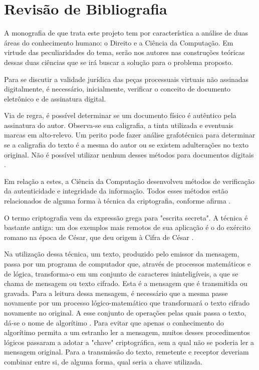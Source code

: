 \chapter{Revisão de Bibliografia}

  A monografia de que trata este projeto tem por característica a
  análise de duas áreas do conhecimento humano: o Direito e a
  Ciência da Computação. Em virtude das peculiaridades do tema,
  serão nos autores nas construções teóricas dessas duas ciências
  que se irá buscar a solução para o problema proposto.\par

  Para se discutir a validade jurídica das peças processuais
  virtuais não assinadas digitalmente, é necessário,
  inicialmente, verificar o conceito de documento eletrônico e de
  assinatura digital.\par

  Via de regra, é possível determinar se um documento físico é
  autêntico pela assinatura do autor. Observa-se sua caligrafia,
  a tinta utilizada e eventuais marcas em alto-relevo. Um perito
  pode fazer análise grafotécnica para determinar se a caligrafia
  do texto é a mesma do autor ou se existem adulterações no texto
  original. Não é possível utilizar nenhum desses métodos para
  documentos digitais \cite{ComputerNetworks, CertificadoDigital}.\par

  Em relação a estes, a Ciência da Computação desenvolveu métodos
  de verificação da autenticidade e integridade da informação.
  Todos esses métodos estão relacionados de alguma forma à
  técnica da criptografia, conforme afirma
  .\par

  O termo criptografia vem da expressão grega para "escrita
  secreta". A técnica é bastante antiga: um dos exemplos mais
  remotos de sua aplicação é o do exército romano na época de
  César, que deu origem à Cifra de César \cite[p.
  555]{ComputerNetworks}.\par

  Na utilização dessa técnica, um texto, produzido pelo emissor da
  mensagem, passa por um programa de computador que, através de
  processos matemáticos e de lógica, transforma-o em um conjunto de
  caracteres ininteligíveis, a que se chama de mensagem ou texto
  cifrado.  Esta é a mensagem que é transmitida ou gravada. Para
  a leitura dessa mensagem, é necessário que a mesma passe
  novamente por um processo lógico-matemático que transformará o
  texto cifrado novamente no original. A esse conjunto de
  operações pelas quais passa o texto, dá-se o nome de
  algorítimo \cite{ComputerNetworks}. Para evitar que apenas o
  conhecimento do algorítimo permita a um estranho ler a
  mensagem, muitos desses procedimentos lógicos passaram a adotar
  a "chave" criptográfica, sem a qual não se poderia ler a
  mensagem original. Para a transmissão do texto, remetente e
  receptor deveriam combinar entre si, de alguma forma, qual
  seria a chave utilizada.\par

